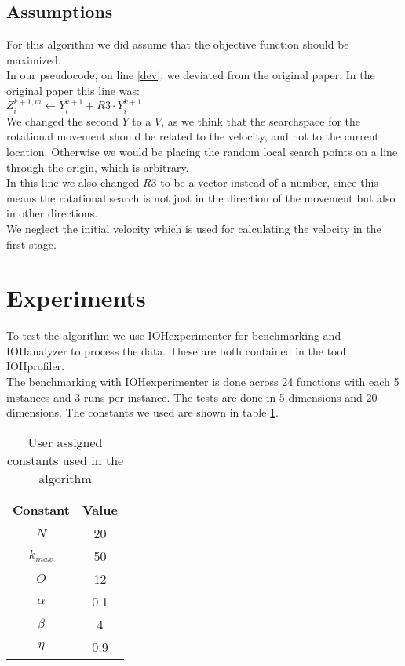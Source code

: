 \documentclass[runningheads]{llncs}
\begin{document}
\newpage
\subsection{Assumptions}
For this algorithm we did assume that the objective function should be maximized.\\
In our pseudocode, on line \ref{dev}, we deviated from the original paper. In the original paper this line was: \\
$Z_i^{k+1, m} \leftarrow Y_i^{k+1} + R3 \cdot Y_i^{k+1}$ \\
We changed the second $ Y $ to a $V$, as we think that the searchspace for the rotational movement should be related to the velocity, and not to the current location. Otherwise we would be placing the random local search points on a line through the origin, which is arbitrary. \\ %
In this line we also changed $R3$ to be a vector instead of a number, since this means the rotational search is not just in the direction of the movement but also in other directions. \\
We neglect the initial velocity which is used for calculating the velocity in the first stage.\\


\section{Experiments}
To test the algorithm we use IOHexperimenter for benchmarking and IOHanalyzer to process the data. These are both contained in the tool IOHprofiler\cite{IOHprofiler}.\\
The benchmarking with IOHexperimenter is done across 24 functions with each 5 instances and 3 runs per instance. The tests are done in 5 dimensions and 20 dimensions. The constants we used are shown in table \ref{tab:constants}.
\begin{table}[h!]
    \centering
    \begin{tabular}{c|c}
        Constant & Value \\ \hline \hline
        $N$ & 20\\\hline
        $k_{max}$ & 50\\\hline
        $O$ & 12 \\\hline
        $\alpha$ & 0.1 \\\hline
        $\beta$ & 4 \\\hline
        $\eta$ & 0.9
        \end{tabular}
    \caption{User assigned constants used in the algorithm}
    \label{tab:constants}
\end{table}{}
\end{document}
